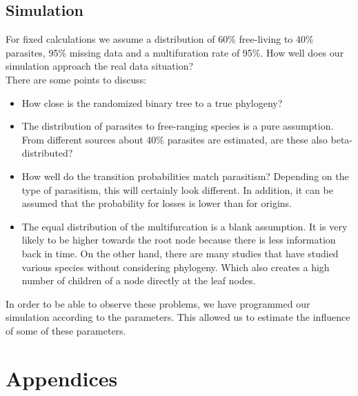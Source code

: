   \section{Simulation}
    For fixed calculations we assume a distribution of 60\% free-living to 40\% parasites, 95\% 
      missing data and a multifuration rate of 95\%.
    How well does our simulation approach the real data situation? \\
    There are some points to discuss:
    \begin{itemize}
      \item How close is the randomized binary tree to a true phylogeny?
      \item The distribution of parasites to free-ranging species is a pure assumption. From different 
        sources about 40\% parasites are estimated, are these also beta-distributed?
      \item How well do the transition probabilities match parasitism? Depending on the type of 
        parasitism, this will certainly look different. In addition, it can be assumed that the 
        probability for losses is lower than for origins.
      \item The equal distribution of the multifurcation is a blank assumption. It is very likely to 
        be higher towards the root node because there is less information back in time. On the other 
        hand, there are many studies that have studied various species without considering phylogeny. 
        Which also creates a high number of children of a node directly at the leaf nodes.
    \end{itemize}
    In order to be able to observe these problems, we have programmed our simulation according to the 
      parameters. This allowed us to estimate the influence of some of these parameters.

  


\chapter{Appendices}
